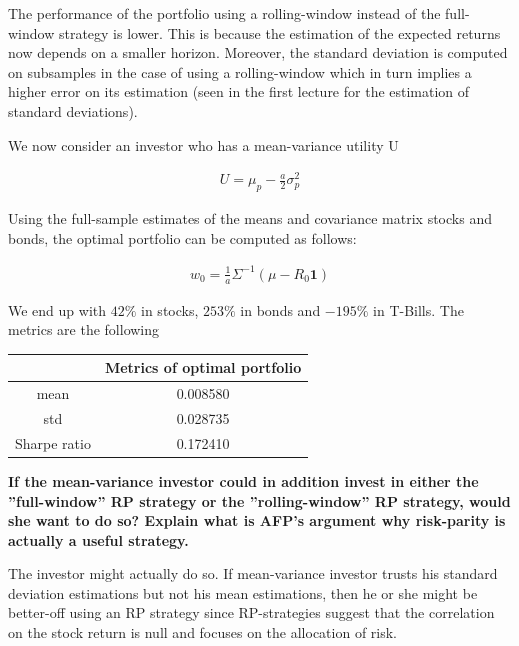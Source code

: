 \documentclass[10pt]{article}
\newenvironment{exercise}[2][Exercise]{\begin{trivlist}
  \item[\hskip \labelsep {\bfseries #1}\hskip \labelsep {\bfseries #2.}]}{\end{trivlist}}
\begin{document}
\begin{exercise}{3}
	\smallbreak
	
	The performance of the portfolio using a rolling-window instead of the full-window strategy is lower. This is because the estimation of  the expected returns now depends on a smaller horizon. Moreover, the standard deviation is computed on subsamples in the case of using a rolling-window which in turn implies a higher error on its estimation (seen in the first lecture for the estimation of standard deviations).
	
	\bigbreak
	
	We now consider an investor who has a mean-variance utility U
	
	\begin{align*}
		U = \mu_{p} - \frac{a}{2}\sigma^{2}_{p}
	\end{align*}
	
	Using the full-sample estimates of the means and covariance matrix stocks and bonds, the optimal portfolio can be computed as follows:
	
	\begin{align*}
		w_{0} = \frac{1}{a} \Sigma^{-1} (\mu  - R_{0}\textbf{1})
	\end{align*}
	
	We end up with $42\%$ in stocks, $253\%$ in bonds and $-195\%$ in T-Bills. The metrics are the following
	
	\begin{table}[h!]
		\centering
 		\begin{tabular}{||c c||} 
 			\hline
 			& Metrics of optimal portfolio \\ [0.5ex] 
 			\hline\hline
 			mean & 0.008580 \\ 
 			std & 0.028735 \\
 			Sharpe ratio & 0.172410 \\ [1ex] 
 			\hline
		 \end{tabular}
	\end{table}	
	
	\textbf{If the mean-variance investor could in addition invest in either the ”full-window” RP strategy or the ”rolling-window” RP strategy, would she want to do so? Explain what is AFP’s argument why risk-parity is actually a useful strategy.}
	
	\smallbreak
	
	The investor might actually do so. If mean-variance investor trusts his standard deviation estimations but not his mean estimations, then he or she might be better-off using an RP strategy since RP-strategies suggest that the correlation on the stock return is null and focuses on the allocation of risk.


\end{exercise}
  
\end{document}
